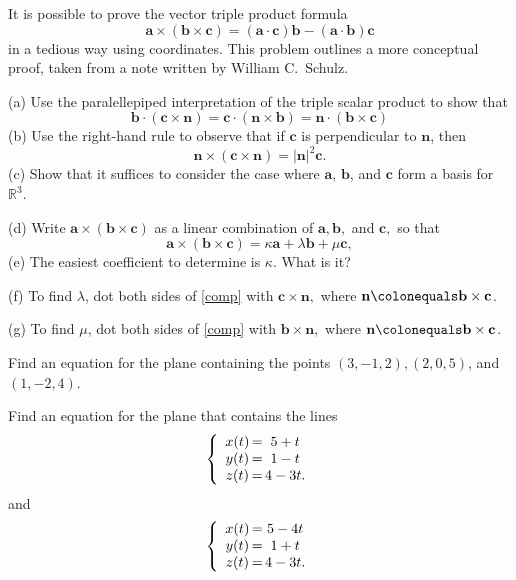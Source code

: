 \documentclass[svgnames]{watsonbook}
\begin{document}
\begin{aexercise}%
  It is possible to prove the vector triple product formula
  \[
    \mathbf{a}\times(\mathbf{b}\times\mathbf{c}) =
    (\mathbf{a}\cdot\mathbf{c})\mathbf{b} -
    (\mathbf{a}\cdot\mathbf{b})\mathbf{c}
  \]
  in a tedious way using coordinates. This problem outlines a more
  conceptual proof, taken from a note written by William C.\ Schulz.

  (a) Use the paralellepiped interpretation of the triple scalar
  product to show that
  \[
    \mathbf{b}\cdot(\mathbf{c}\times\mathbf{n}) =
    \mathbf{c}\cdot(\mathbf{n}\times\mathbf{b}) =
    \mathbf{n}\cdot(\mathbf{b}\times\mathbf{c})
  \]
  (b) Use the right-hand rule to observe that if $\mathbf{c}$ is
  perpendicular to $\mathbf{n}$, then
  \[
    \mathbf{n}\times(\mathbf{c}\times\mathbf{n}) =
    |\mathbf{n}|^2\mathbf{c}.
  \]
  (c) Show that it suffices to consider the case where $\mathbf{a}$,
  $\mathbf{b}$, and $\mathbf{c}$ form a basis for $\mathbb{R}^3$.

  (d) Write $\mathbf{a}\times(\mathbf{b}\times\mathbf{c})$ as a linear
  combination of $\mathbf{a}, \mathbf{b},$ and $\mathbf{c},$ so that
  \begin{equation} \label{comp}
    \mathbf{a}\times(\mathbf{b}\times\mathbf{c}) = \kappa
    \mathbf{a}+\lambda \mathbf{b}+\mu\mathbf{c},
  \end{equation} 
  (e) The easiest coefficient to determine is $\kappa$. What is it?

  (f) To find $\lambda$, dot both sides of \eqref{comp} with
  $\mathbf{c}\times \mathbf{n},$ where
  $\mathbf{n}\colonequals \mathbf{b}\times\mathbf{c}$.

  (g) To find $\mu$, dot both sides of \eqref{comp} with
  $\mathbf{b}\times \mathbf{n},$ where
  $\mathbf{n}\colonequals \mathbf{b}\times\mathbf{c}$.
\end{aexercise}


\begin{aexercise}
  Find an equation for the plane containing the points $(3, -1, 2),
  (2, 0, 5)$, and $(1, -2, 4)$.
\end{aexercise}

\begin{aexercise}
  Find an equation for the plane that contains the lines
\[
\left\{
\begin{array}{c@{\,}c@{\,}c}
  x(t)&=&5+t \\
  y(t)&=&1-t \\
  z(t)&=&4-3t. 
\end{array}
\right.
\]
and
\[
\left\{
\begin{array}{c@{\,}c@{\,}c}
  x(t)&=&5-4t \\
  y(t)&=&1+t \\
  z(t)&=&4-3t. 
\end{array}
\right.
\]
\end{aexercise}
\end{document}
